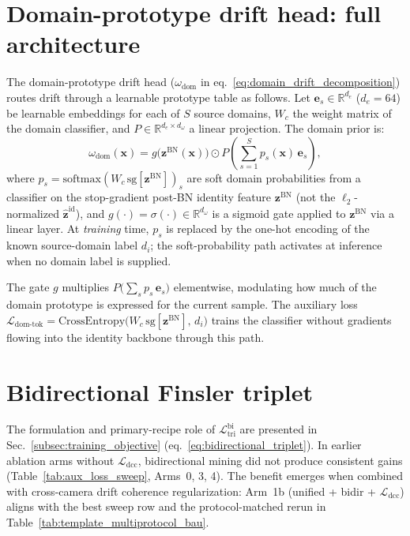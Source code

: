 
\section{Domain-prototype drift head: full architecture} \label{sec:suppl_domain_proto_head}
The domain-prototype drift head ($\omega_{\mathrm{dom}}$ in eq.~\ref{eq:domain_drift_decomposition}) routes drift through a learnable prototype table as follows. Let $\mathbf{e}_s\in\mathbb{R}^{d_e}$ ($d_e{=}64$) be learnable embeddings for each of $S$ source domains, $W_c$ the weight matrix of the domain classifier, and $P\in\mathbb{R}^{d_e\times d_\omega}$ a linear projection. The domain prior is:
\begin{equation}
    \omega_{\mathrm{dom}}(\mathbf{x}) = g\!\bigl(\mathbf{z}^{\mathrm{BN}}(\mathbf{x})\bigr) \odot P\!\left(\sum_{s=1}^{S} p_s(\mathbf{x})\,\mathbf{e}_s\right) ,
    \label{eq:domain_prior}
\end{equation}
where $p_s = \mathrm{softmax}(W_c\,\mathrm{sg}[\mathbf{z}^{\mathrm{BN}}])_s$ are soft domain probabilities from a classifier on the stop-gradient post-BN identity feature $\mathbf{z}^{\mathrm{BN}}$ (not the $\ell_2$-normalized $\hat{\mathbf{z}}^{\mathrm{id}}$), and $g(\cdot) = \sigma(\cdot) \in \mathbb{R}^{d_\omega}$ is a sigmoid gate applied to $\mathbf{z}^{\mathrm{BN}}$ via a linear layer. At \emph{training} time, $p_s$ is replaced by the one-hot encoding of the known source-domain label $d_i$; the soft-probability path activates at inference when no domain label is supplied.

The gate $g$ multiplies $P\bigl(\sum_s p_s\,\mathbf{e}_s\bigr)$ elementwise, modulating how much of the domain prototype is expressed for the current sample. The auxiliary loss $\mathcal{L}_{\mathrm{dom\text{-}tok}} = \mathrm{CrossEntropy}\bigl(W_c\,\mathrm{sg}[\mathbf{z}^{\mathrm{BN}}],\, d_i\bigr)$ trains the classifier without gradients flowing into the identity backbone through this path.

\section{Bidirectional Finsler triplet} \label{sec:suppl_bidirectional_triplet}
The formulation and primary-recipe role of $\mathcal{L}_{\mathrm{tri}}^{\mathrm{bi}}$ are presented in Sec.~\ref{subsec:training_objective} (eq.~\ref{eq:bidirectional_triplet}). In earlier ablation arms without $\mathcal{L}_{\mathrm{dcc}}$, bidirectional mining did not produce consistent gains (Table~\ref{tab:aux_loss_sweep}, Arms~0, 3, 4). The benefit emerges when combined with cross-camera drift coherence regularization: Arm~1b (unified + bidir + $\mathcal{L}_{\mathrm{dcc}}$) aligns with the best sweep row and the protocol-matched rerun in Table~\ref{tab:template_multiprotocol_bau}.

